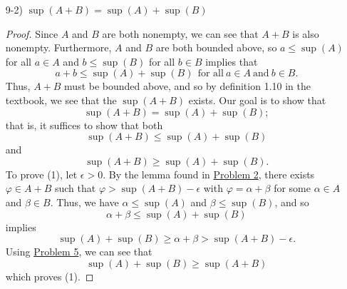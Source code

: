 \documentclass[11pt,a4paper]{article}
\begin{document}
\begin{enumerate}
\begin{enumerate}
\begin{proof}
                To show (1), let \( \epsilon > 0 \). Using the lemma found in {\hyperref[Problem 2]{Problem 2}}, there exists an \( \alpha \in A  \) and \( \beta \in \beta  \) such that 
                \[  \alpha < \inf(A) + \frac{ \epsilon }{ 2 } \]
                and
                \[  \beta < \inf(B) + \frac{ \epsilon }{ 2 },  \]
                respectively. Adding these two inequalities, we get
                \[  \alpha + \beta < \inf(A) + \inf(B) + \epsilon. \]
                Since \( A + B  \) is bounded below, we have \( \inf(A+B) \leq \alpha + \beta  \) such that 
                \[  \inf(A+B) \leq \alpha + \beta < \inf(A) + \inf(B) + \epsilon. \]
                Using {\hyperref[Problem 5]{Problem 5}}, we conclude that   
                \[  \inf(A+B) \leq \inf(A) + \inf(B). \]

                To show (2), let \( \epsilon > 0  \) again. Using the same lemma, there exiss \( \varphi \in A +B  \) with \( \varphi = \gamma + \lambda  \) where \( \gamma \in A  \) and \( \lambda \in B  \) such that 
                \[  \gamma + \lambda = \varphi < \inf(A+B) + \epsilon. \]
                Since \( A  \) and \( B  \) are both bounded below, we can see that
                \[ \inf(A) + \inf(B)  \leq   \gamma + \lambda. \]
                Thus, we have
                \[  \inf(A) + \inf(B) \leq \inf(A+B)  \]
                by {\hyperref[Problem 5]{Problem 5}}.
            \end{proof}
        \item[9-2)] \( \sup (A + B) = \sup (A) + \sup (B) \) 

            \begin{proof}
            Since \( A  \) and \( B \) are both nonempty, we can see that \( A + B   \) is also nonempty. Furthermore, \( A  \) and \( B  \) are both bounded above, so \( a \leq \sup (A) \) for all \( a \in A  \) and \( b \leq \sup(B) \) for all \( b \in B  \) implies that 
            \[  a + b \leq \sup(A) + \sup(B) \ \   \text{for all} \  a \in A \  \text{and} \  b \in B.   \]
            Thus, \(  A + B  \) must be bounded above, and so by definition 1.10 in the textbook, we see that the \( \sup(A+B) \) exists. Our goal is to show that  
            \[  \sup (A + B) = \sup(A) + \sup(B); \]
            that is, it suffices to show that both
            \[ \sup(A+B) \leq \sup(A) + \sup(B) \tag{1}  \]
            and
            \[  \sup(A+B) \geq \sup(A) + \sup(B) \tag{2}. \]
            To prove (1), let \( \epsilon > 0  \). By the lemma found in {\hyperref[Problem 2]{Problem 2}}, there exists \( \varphi \in A +  B \) such that \( \varphi > \sup(A+B) - \epsilon \) with \( \varphi = \alpha + \beta  \) for some \( \alpha \in A  \) and \( \beta \in B  \). Thus, we have \( \alpha \leq \sup(A) \) and \( \beta \leq \sup(B) \), and so        
            \[  \alpha + \beta \leq \sup(A) + \sup(B) \]
            implies
            \[  \sup(A) + \sup(B) \geq \alpha + \beta > \sup(A+B) - \epsilon. \]
            Using {\hyperref[Problem 5]{Problem 5}}, we can see that  
            \[  \sup(A) + \sup(B) \geq \sup(A+B) \]
            which proves (1).


\end{proof}
\end{enumerate}
\end{enumerate}
\end{document}
